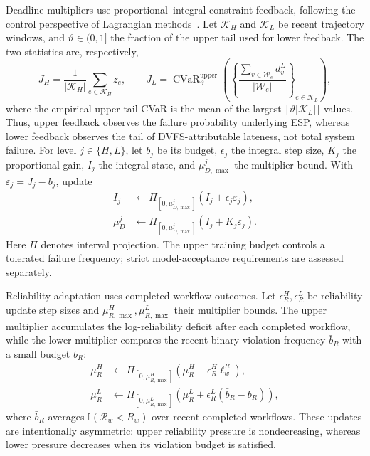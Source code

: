 \documentclass[10pt,twocolumn]{article}
\begin{document}
Deadline multipliers use proportional--integral constraint feedback,
following the control perspective of Lagrangian
methods~\cite{stooke2020}. Let $\mathcal K_H$ and $\mathcal K_L$ be recent
trajectory windows, and $\vartheta\in(0,1]$ the fraction of the upper
tail used for lower feedback. The two statistics are, respectively,
\begin{equation}
 J_H=\frac{1}{|\mathcal K_H|}\sum_{e\in\mathcal K_H}z_e,
 \qquad
 J_L=\operatorname{CVaR}^{\mathrm{upper}}_{\vartheta}
 \left(\left\{\frac{\sum_{v\in\mathcal W_e}d_v^L}{|\mathcal W_e|}
 \right\}_{e\in\mathcal K_L}\right),
 \label{eq:method_dual_statistics}
\end{equation}
where the empirical upper-tail CVaR is the mean of the largest
$\lceil\vartheta|\mathcal K_L|\rceil$ values. Thus, upper feedback observes
the failure probability underlying ESP, whereas lower feedback
observes the tail of DVFS-attributable lateness, not total system
failure. For level $j\in\{H,L\}$, let $b_j$ be its budget, $\epsilon_j$
the integral step size, $K_j$ the proportional gain, $I_j$ the integral
state, and $\mu_{D,\max}^j$ the multiplier bound. With
$\varepsilon_j=J_j-b_j$, update
\begin{align}
 I_j&\leftarrow\Pi_{[0,\mu_{D,\max}^j]}(I_j+\epsilon_j\varepsilon_j),\nonumber\\
 \mu_D^j&\leftarrow\Pi_{[0,\mu_{D,\max}^j]}(I_j+K_j\varepsilon_j).
 \label{eq:method_pi_dual}
\end{align}
Here $\Pi$ denotes interval projection. The upper training budget
controls a tolerated failure frequency;
strict model-acceptance requirements are assessed separately.

Reliability adaptation uses completed workflow outcomes. Let
$\epsilon_R^H,\epsilon_R^L$ be reliability update step sizes and
$\mu_{R,\max}^H,\mu_{R,\max}^L$ their multiplier bounds. The upper
multiplier accumulates the log-reliability deficit after each completed
workflow, while the lower multiplier compares the recent binary
violation frequency $\bar b_R$ with a small budget $b_R$:
\begin{align}
 \mu_R^H&\leftarrow
 \Pi_{[0,\mu_{R,\max}^H]}(\mu_R^H+\epsilon_R^H\ell_w^R),\nonumber\\
 \mu_R^L&\leftarrow
 \Pi_{[0,\mu_{R,\max}^L]}(\mu_R^L+\epsilon_R^L(\bar b_R-b_R)),
 \label{eq:method_reliability_duals}
\end{align}
where $\bar b_R$ averages $\mathbb{I}(\mathcal R_w<R_w)$ over recent
completed workflows. These updates are intentionally asymmetric: upper reliability
pressure is nondecreasing, whereas lower pressure decreases when its
violation budget is satisfied.
\end{document}
